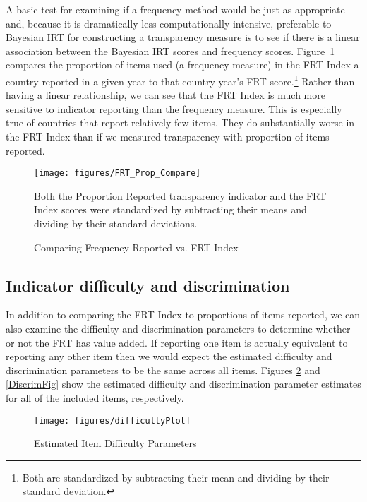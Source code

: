 \documentclass[a4paper]{article}
\begin{document}
A basic test for examining if a frequency method would be just as appropriate and, because it is dramatically less computationally intensive, preferable to Bayesian IRT for constructing a transparency measure is to see if there is a linear association between the Bayesian IRT scores and frequency scores. Figure~\ref{CompFreqFRT} compares the proportion of items used (a frequency measure) in the FRT Index a country reported in a given year to that country-year's FRT score.\footnote{Both are standardized by subtracting their mean and dividing by their standard deviation.} Rather than having a linear relationship, we can see that the FRT Index is much more sensitive to indicator reporting than the frequency measure. This is especially true of countries that report relatively few items. They do substantially worse in the FRT Index than if we measured transparency with proportion of items reported.

\begin{figure}
    \caption{Comparing Frequency Reported vs. FRT Index}
    \label{CompFreqFRT}
    \begin{center}
        \texttt{[image: figures/FRT\_Prop\_Compare]} 
    \end{center}
    {\scriptsize{Both the Proportion Reported transparency indicator and the FRT Index scores were standardized by subtracting their means and dividing by their standard deviations.}}
\end{figure}


\subsection{Indicator difficulty and discrimination}

In addition to comparing the FRT Index to proportions of items reported, we can also examine the difficulty and discrimination parameters to determine whether or not the FRT has value added. If reporting one item is actually equivalent to reporting any other item then we would expect the estimated difficulty and discrimination parameters to be the same across all items. Figures \ref{DifficultyFig} and \ref{DiscrimFig} show the estimated difficulty and discrimination parameter estimates for all of the included items, respectively. 


\begin{figure}
    \caption{Estimated Item Difficulty Parameters}
    \label{DifficultyFig}
    \begin{center}
        \texttt{[image: figures/difficultyPlot]}
    \end{center}
\end{figure}
\end{document}
